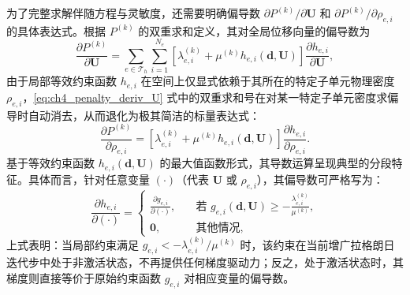 为了完整求解伴随方程与灵敏度，还需要明确偏导数 $\partial P^{(k)}/\partial \boldsymbol{U}$ 和 $\partial P^{(k)}/\partial\rho_{e,i}$ 的具体表达式。根据 $P^{(k)}$ 的双重求和定义，其对全局位移向量的偏导数为
\begin{equation}
	\frac{\partial P^{(k)}}{\partial \boldsymbol{U}} = \sum_{e \in \mathcal{T}_h} \sum_{i=1}^{N_e} \left[ \lambda_{e,i}^{(k)} + \mu^{(k)} h_{e,i}(\boldsymbol{d}, \boldsymbol{U}) \right] \frac{\partial h_{e,i}}{\partial \boldsymbol{U}},
	\label{eq:ch4_penalty_deriv_U}
\end{equation}
由于局部等效约束函数 $h_{e,i}$ 在空间上仅显式依赖于其所在的特定子单元物理密度 $\rho_{e,i}$，\eqref{eq:ch4_penalty_deriv_U} 式中的双重求和号在对某一特定子单元密度求偏导时自动消去，从而退化为极其简洁的标量表达式：
\[
\frac{\partial P^{(k)}}{\partial\rho_{e,i}} = \left[ \lambda_{e,i}^{(k)} + \mu^{(k)} h_{e,i}(\boldsymbol{d}, \boldsymbol{U}) \right] \frac{\partial h_{e,i}}{\partial\rho_{e,i}}.
\]
基于等效约束函数 $h_{e,i}(\boldsymbol{d}, \boldsymbol{U})$ 的最大值函数形式，其导数运算呈现典型的分段特征。具体而言，针对任意变量 $(\cdot)$（代表 $\boldsymbol{U}$ 或 $\rho_{e,i}$），其偏导数可严格写为：
\begin{equation} \label{eq:ch4_h_derivative}
	\frac{\partial h_{e,i}}{\partial(\cdot)} = 
	\begin{cases}
		\displaystyle \frac{\partial g_{e,i}}{\partial(\cdot)}, &\quad \text{若 } g_{e,i}(\boldsymbol{d}, \boldsymbol{U}) \ge -\frac{\lambda_{e,i}^{(k)}}{\mu^{(k)}}, \\
		\boldsymbol{0}, &\quad \text{其他情况},
	\end{cases}
\end{equation}
上式表明：当局部约束满足 $g_{e,i} < -\lambda_{e,i}^{(k)}/\mu^{(k)}$ 时，该约束在当前增广拉格朗日迭代步中处于非激活状态，不再提供任何梯度驱动力；反之，处于激活状态时，其梯度则直接等价于原始约束函数 $g_{e,i}$ 对相应变量的偏导数。

